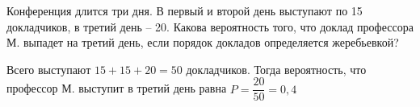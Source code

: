  Конференция длится три дня. В первый и второй день выступают по 15 докладчиков, в третий день -- 20. Какова вероятность того, что доклад профессора М. выпадет на третий день, если порядок докладов определяется жеребьевкой?

\Solution Всего выступают $15+15+20=50$ докладчиков. Тогда вероятность, что профессор М. выступит в третий день равна $P=\dfrac{20}{50}=0,4$\\
